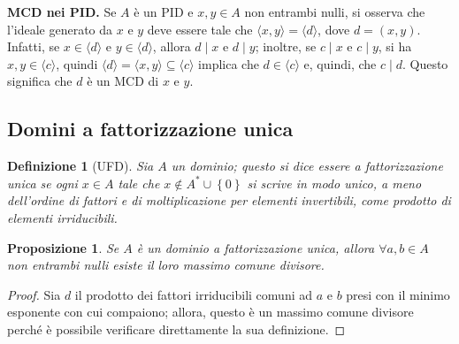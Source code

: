 \documentclass[11pt]{article}
\theoremstyle{style}
\newtheorem{definizione}{Definizione}[section]
\newtheorem{prop}{Proposizione}[section]
\numberwithin{equation}{subsection}
\renewcommand{\textbf}[1]{\textsf{\bfseries #1}}
\begin{document}
\textbf{MCD nei PID.} Se $A$ \`e un PID e $x,y \in A$ non entrambi nulli, si osserva che l'ideale generato da $x$ e $y$ deve essere tale che $\langle x,y \rangle=\langle d \rangle$, dove $d = (x,y)$.
Infatti, se $x \in \langle d \rangle$ e $y \in \langle d \rangle$, allora $d  \mid x $ e $d \mid y$; inoltre, se $c  \mid x $ e $c \mid y$, si ha $x,y \in \langle c \rangle$, quindi $\langle d \rangle=\langle x,y \rangle \subseteq \langle c \rangle$ implica che $d \in \langle c \rangle$ e, quindi, che $c \mid d$.
Questo significa che $d$ \`e un MCD di $x$ e $y$.

\subsection{Domini a fattorizzazione unica}
\begin{definizione}
	[UFD]
	Sia $A$ un dominio; questo si dice essere \textit{a fattorizzazione unica} se ogni $ x \in A$ tale che $x\not\in A^* \cup \left\{ 0 \right\} $ si scrive in modo unico, a meno dell'ordine di fattori e di moltiplicazione per elementi invertibili, come prodotto di elementi irriducibili.
\end{definizione}
\begin{prop}
	Se $A$ \`e un dominio a fattorizzazione unica, allora $\forall a,b \in A$ non entrambi nulli esiste il loro massimo comune divisore.
\end{prop}
	\begin{proof}
		Sia $d$ il prodotto dei fattori irriducibili comuni ad $a$ e $b$ presi con il minimo esponente con cui compaiono; allora, questo \`e un massimo comune divisore perch\'e \`e possibile verificare direttamente la sua definizione.
	\end{proof}
\end{document}

